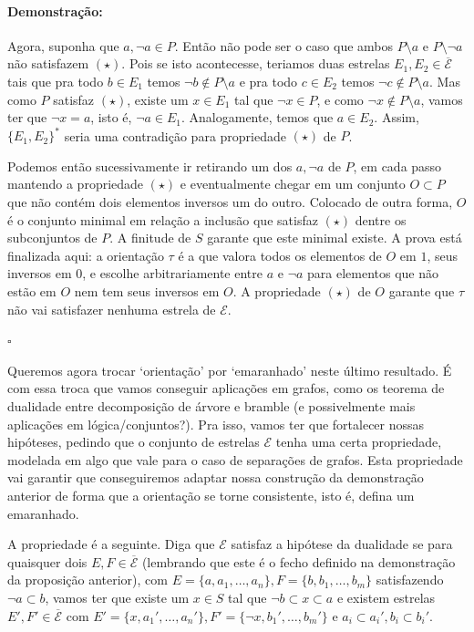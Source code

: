 \documentclass[11pt]{article}
\newcommand{\pulinho}{\vspace{.5cm}}
\theoremstyle{definition}
\theoremstyle{definition}
\theoremstyle{definition}
\theoremstyle{definition}
\theoremstyle{definition}
\theoremstyle{definition}
\theoremstyle{definition}
\theoremstyle{definition}
\theoremstyle{definition}
\theoremstyle{definition}
\theoremstyle{definition}
\theoremstyle{definition}
\newenvironment{prova}{\paragraph{Demonstração:}}{\hfill$\square$ 
\pulinho
}
\theoremstyle{definition}
\theoremstyle{definition}
\begin{document}
\begin{prova}
Agora, suponha que $a,\lnot a \in P$. Então não pode ser o caso que ambos $P \setminus {a}$ e $P \setminus {\lnot a}$ não satisfazem $(\star)$. Pois se isto acontecesse, teriamos duas estrelas $E_1, E_2 \in \overline{\mathcal{E}}$ tais que pra todo $b \in E_1$ temos $\lnot b \notin P \setminus {a}$ e pra todo $c \in E_2$ temos $\lnot c \notin P \setminus {a}$. Mas como $P$ satisfaz $(\star)$, existe um $x \in E_1$ tal que $\lnot x \in P$, e como $\lnot x \notin P \setminus {a}$, vamos ter que $\lnot x = a$, isto é, $\lnot a \in E_1$. Analogamente, temos que $a \in E_2$. Assim, $\{E_1,E_2\}^*$ seria uma contradição para propriedade $(\star)$ de $P$.

Podemos então sucessivamente ir retirando um dos $a,\lnot a$ de $P$, em cada passo mantendo a propriedade $(\star)$ e eventualmente chegar em um conjunto $O \subset P$ que não contém dois elementos inversos um do outro. Colocado de outra forma, $O$ é o conjunto minimal em relação a inclusão que satisfaz $(\star)$ dentre os subconjuntos de $P$. A finitude de $S$ garante que este minimal existe. A prova está finalizada aqui: a orientação $\tau$ é a que valora todos os elementos de $O$ em $1$, seus inversos em $0$, e escolhe arbitrariamente entre $a$ e $\lnot a$ para elementos que não estão em $O$ nem tem seus inversos em $O$. A propriedade $(\star)$ de $O$ garante que $\tau$ não vai satisfazer nenhuma estrela de $\mathcal{E}$.

\end{prova}

Queremos agora trocar `orientação' por `emaranhado' neste último resultado. É com essa troca que vamos conseguir aplicações em grafos, como os teorema de dualidade entre decomposição de árvore e bramble (e possivelmente mais aplicações em lógica/conjuntos?). Pra isso, vamos ter que fortalecer nossas hipóteses, pedindo que o conjunto de estrelas $\mathcal{E}$ tenha uma certa propriedade, modelada em algo que vale para o caso de separações de grafos. Esta propriedade vai garantir que conseguiremos adaptar nossa construção da demonstração anterior de forma que a orientação se torne consistente, isto é, defina um emaranhado.

A propriedade é a seguinte. Diga que $\mathcal{E}$ satisfaz a hipótese da dualidade se para quaisquer dois $E,F \in \overline{\mathcal{E}}$ (lembrando que este é o fecho definido na demonstração da proposição anterior), com $E = \{a, a_1, \dots, a_n\}, F = \{b, b_1, \dots, b_m\}$ satisfazendo $\lnot a \subset b$, vamos ter que existe um $x \in S$ tal que $\lnot b \subset x \subset a$ e existem estrelas $E',F' \in \overline{\mathcal{E}}$ com $E' = \{x, a_1',\dots, a_n'\}, F' = \{\lnot x, b_1', \dots, b_m'\}$ e $a_i \subset a_i', b_i \subset b_i'$.
\end{document}
